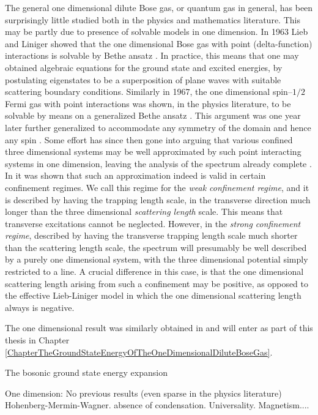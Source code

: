 The general one dimensional dilute Bose gas, or quantum gas in general, has been surprisingly little studied both in the physics and mathematics literature. This may be partly due to presence of solvable models in one dimension. In 1963 Lieb and Liniger showed that the one dimensional Bose gas with point (delta-function) interactions is solvable by Bethe ansatz \cite{lieb1963exact}. In practice, this means that one may obtained algebraic equations for the ground state and excited energies, by postulating eigenstates to be a superposition of plane waves with suitable scattering boundary conditions. Similarly in 1967, the one dimensional spin--$ 1/2 $ Fermi gas with point interactions was shown, in the physics literature, to be solvable by means on a generalized Bethe ansatz \cite{yang1967some}. This argument was one year later further generalized to accommodate any symmetry of the domain and hence any spin \cite{sutherland1968further}. Some effort has since then gone into arguing that various confined three dimensional systems may be well approximated by such point interacting systems in one dimension, leaving the analysis of the spectrum already complete \cite{olshanii1998atomic,petrov2000regimes,dunjko2001bosons,lieb2003one,lieb2004one,seiringer2008lieb}. In \cite{lieb2003one,lieb2004one,seiringer2008lieb} it was shown that such an approximation indeed is valid in certain confinement regimes. We call this regime for the \emph{weak confinement regime}, and it is described by having the trapping length scale, in the transverse direction much longer than the three dimensional \emph{scattering length} scale. This means that transverse excitations cannot be neglected. However, in the \emph{strong confinement regime}, described by having the transverse trapping length scale much shorter than the scattering length scale, the spectrum will presumably be well described by a purely one dimensional system, with the three dimensional potential simply restricted to a line. A crucial difference in this case, is that the one dimensional scattering length arising from such a confinement may be positive, as opposed to the effective Lieb-Liniger model in which the one dimensional scattering length always is negative.


The one dimensional result was similarly obtained in \cite{agerskov2022ground} and will enter as part of this thesis in Chapter \ref{ChapterTheGroundStateEnergyOfTheOneDimensionalDiluteBoseGas}.

The bosonic ground state energy expansion 

One dimension: No previous results (even sparse in the physics literature) Hohenberg-Mermin-Wagner. absence of condensation. Universality. Magnetism....
